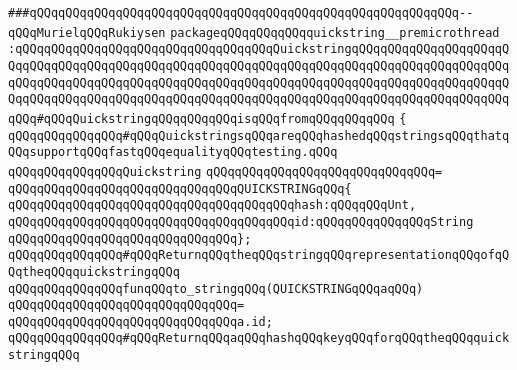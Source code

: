\verb|###qQQqqQQqqQQqqQQqqQQqqQQqqQQqqQQqqQQqqQQqqQQqqQQqqQQqqQQqqQQq--qQQqMurielqQQqRukiysen|\newline
\newline
\newline
\verb|packageqQQqqQQqqQQqquickstring__premicrothread|\newline
\verb|:qQQqqQQqqQQqqQQqqQQqqQQqqQQqqQQqqQQqQuickstringqQQqqQQqqQQqqQQqqQQqqQQqqQQqqQQqqQQqqQQqqQQqqQQqqQQqqQQqqQQqqQQqqQQqqQQqqQQqqQQqqQQqqQQqqQQqqQQqqQQqqQQqqQQqqQQqqQQqqQQqqQQqqQQqqQQqqQQqqQQqqQQqqQQqqQQqqQQqqQQqqQQqqQQqqQQqqQQqqQQqqQQqqQQqqQQqqQQqqQQqqQQqqQQqqQQqqQQqqQQqqQQqqQQqqQQqqQQq#qQQqQuickstringqQQqqQQqqQQqisqQQqfromqQQqqQQqqQQq|\newline
\verb|{|\newline
\verb|qQQqqQQqqQQqqQQq#qQQqQuickstringsqQQqareqQQqhashedqQQqstringsqQQqthatqQQqsupportqQQqfastqQQqequalityqQQqtesting.qQQq|\newline
\newline
\verb|qQQqqQQqqQQqqQQqQuickstring|\newline
\verb|qQQqqQQqqQQqqQQqqQQqqQQqqQQqqQQq=|\newline
\verb|qQQqqQQqqQQqqQQqqQQqqQQqqQQqqQQqQUICKSTRINGqQQq{|\newline
\verb|qQQqqQQqqQQqqQQqqQQqqQQqqQQqqQQqqQQqqQQqhash:qQQqqQQqUnt,|\newline
\verb|qQQqqQQqqQQqqQQqqQQqqQQqqQQqqQQqqQQqqQQqid:qQQqqQQqqQQqqQQqString|\newline
\verb|qQQqqQQqqQQqqQQqqQQqqQQqqQQqqQQq};|\newline
\newline
\newline
\newline
\verb|qQQqqQQqqQQqqQQq#qQQqReturnqQQqtheqQQqstringqQQqrepresentationqQQqofqQQqtheqQQqquickstringqQQq|\newline
\newline
\verb|qQQqqQQqqQQqqQQqfunqQQqto_stringqQQq(QUICKSTRINGqQQqaqQQq)|\newline
\verb|qQQqqQQqqQQqqQQqqQQqqQQqqQQqqQQq=|\newline
\verb|qQQqqQQqqQQqqQQqqQQqqQQqqQQqqQQqa.id;|\newline
\newline
\newline
\newline
\verb|qQQqqQQqqQQqqQQq#qQQqReturnqQQqaqQQqhashqQQqkeyqQQqforqQQqtheqQQqquickstringqQQq|\newline
